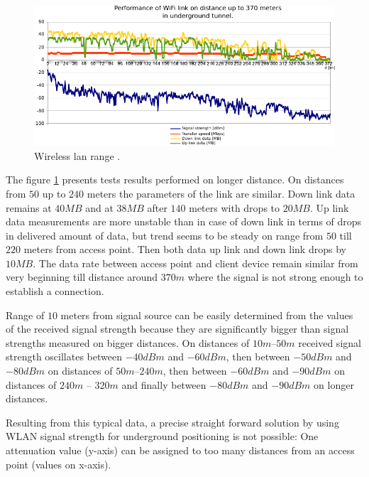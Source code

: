 \documentclass[../main.tex]{subfiles}
\begin{document}
\begin{figure}[!htbp]
\includegraphics[width=\textwidth]{pictures/wifi_link_long.pdf}
\centering
\caption{Wireless lan range \cite{Thesis_CM}. }
\label{fig:wifi_link_long}
\end{figure}

The figure \ref{fig:wifi_link_long} presents tests results performed on longer distance. On distances from $50$ up to $240$ meters the parameters of the link are similar. Down link data remains at $40 MB$ and at $38 MB$ after $140$ meters with drops to $20 MB$. Up link data measurements are more unstable than in case of down link in terms of drops in delivered amount of data, but trend seems to be steady on range from $50$ till $220$ meters from access point. Then both data up link and down link drops by $10 MB$. The data rate between access point and client device remain similar from very beginning till distance around $370m$ where the signal is not strong enough to establish a connection.

Range of $10$ meters from signal source can be easily determined from the values of the received signal strength because they are significantly bigger than signal strengths measured on bigger distances. On distances of $10m$--$50m$ received signal strength oscillates between $-40 dBm$ and $-60 dBm$, then between $-50dBm$ and $-80 dBm$ on distances of $50m$--$240m$, then between $-60dBm$ and $-90 dBm$ on distances of $240m$ -- $320m$ and finally between $-80dBm$ and $-90dBm$ on longer distances.

Resulting from this typical data, a precise straight forward solution by using WLAN signal strength for underground positioning is not possible: One attenuation value (y-axis) can be assigned to too many distances from an access point (values on x-axis).
\end{document}

